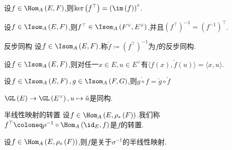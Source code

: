 \begin{corollary}{}{}
	设$f\in\Hom_{A}\left(E,F\right)$,则$\ker\left(f^{\top}\right)=\left(\im\left(f\right)\right)^{\circ}$.
\end{corollary}

\begin{proposition}{}{}
	设$f\in\Isom_{A}\left(E,F\right)$,则$f^{\top}\in\Isom_{A}\left(F^{\vee},E^{\vee}\right)$,并且$\left(f^{\top}\right)^{-1}=\left(f^{-1}\right)^{\top}$.
\end{proposition}

\begin{definition}{反步同构}{}
	设$f\in\Isom_{A}\left(E,F\right)$.称$\check{f}\coloneq\left(f^{\top}\right)^{-1}$为$f$的反步同构.
\end{definition}

\begin{proposition}{}{}
	设$f\in\Isom_{A}\left(E,F\right)$,则对任一$x\in E,u\in E^{\vee}$有$\langle f\left(x\right),\check{f}\left(u\right)\rangle=\langle x,u\rangle$.
\end{proposition}

\begin{proposition}{}{}
	设$f\in\Isom_{A}\left(E,F\right),g\in\Isom_{A}\left(F,G\right)$,则$\check{g\circ f}=\check{g}\circ\check{f}$
\end{proposition}

\begin{proposition}{}{}
	$\GL\left(E\right)\to\GL\left(E^{\vee}\right),u\mapsto\check{u}$是同构.
\end{proposition}

\begin{definition}{半线性映射的转置}{}
	设$f\in\Hom_{A}\left(E,\rho_{\ast}\left(F\right)\right)$.我们称$f^{\top}\coloneq\rho^{-1}\circ\Hom_{A}\left(\id_{E},f\right)$是$f$的转置.
\end{definition}

\begin{proposition}{}{}
	设$f\in\Hom_{A}\left(E,\rho_{\ast}\left(F\right)\right)$,则$f$是关于$\sigma^{-1}$的半线性映射.
\end{proposition}

